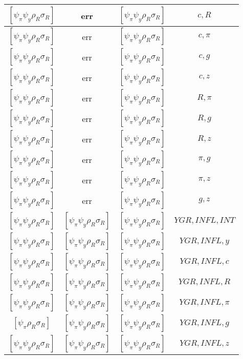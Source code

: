 \documentclass[a4paper,10pt]{article}
\begin{document}
\begin{longtable}{|c|c|c|c|}
\hline
$[\psi_\pi \psi_y \rho_R \sigma_R ]$ & err & $[\psi_\pi \psi_y \rho_R \sigma_R ]$ & ${c},{R}$ \\
\hline
$[\psi_\pi \psi_y \rho_R \sigma_R ]$ & err & $[\psi_\pi \psi_y \rho_R \sigma_R ]$ & ${c},{\pi}$ \\
\hline
$[\psi_\pi \psi_y \rho_R \sigma_R ]$ & err & $[\psi_\pi \psi_y \rho_R \sigma_R ]$ & ${c},{g}$ \\
\hline
$[\psi_\pi \psi_y \rho_R \sigma_R ]$ & err & $[\psi_\pi \psi_y \rho_R \sigma_R ]$ & ${c},{z}$ \\
\hline
$[\psi_\pi \psi_y \rho_R \sigma_R ]$ & err & $[\psi_\pi \psi_y \rho_R \sigma_R ]$ & ${R},{\pi}$ \\
\hline
$[\psi_\pi \psi_y \rho_R \sigma_R ]$ & err & $[\psi_\pi \psi_y \rho_R \sigma_R ]$ & ${R},{g}$ \\
\hline
$[\psi_\pi \psi_y \rho_R \sigma_R ]$ & err & $[\psi_\pi \psi_y \rho_R \sigma_R ]$ & ${R},{z}$ \\
\hline
$[\psi_\pi \psi_y \rho_R \sigma_R ]$ & err & $[\psi_\pi \psi_y \rho_R \sigma_R ]$ & ${\pi},{g}$ \\
\hline
$[\psi_\pi \psi_y \rho_R \sigma_R ]$ & err & $[\psi_\pi \psi_y \rho_R \sigma_R ]$ & ${\pi},{z}$ \\
\hline
$[\psi_\pi \psi_y \rho_R \sigma_R ]$ & err & $[\psi_\pi \psi_y \rho_R \sigma_R ]$ & ${g},{z}$ \\
\hline
$[\psi_\pi \psi_y \rho_R \sigma_R ]$ & $[\psi_\pi \psi_y \rho_R \sigma_R ]$ & $[\psi_\pi \psi_y \rho_R \sigma_R ]$ & ${YGR},{INFL},{INT}$ \\
\hline
$[\psi_\pi \psi_y \rho_R \sigma_R ]$ & $[\psi_\pi \psi_y \rho_R \sigma_R ]$ & $[\psi_\pi \psi_y \rho_R \sigma_R ]$ & ${YGR},{INFL},{y}$ \\
\hline
$[\psi_\pi \psi_y \rho_R \sigma_R ]$ & $[\psi_\pi \psi_y \rho_R \sigma_R ]$ & $[\psi_\pi \psi_y \rho_R \sigma_R ]$ & ${YGR},{INFL},{c}$ \\
\hline
$[\psi_\pi \psi_y \rho_R \sigma_R ]$ & $[\psi_\pi \psi_y \rho_R \sigma_R ]$ & $[\psi_\pi \psi_y \rho_R \sigma_R ]$ & ${YGR},{INFL},{R}$ \\
\hline
$[\psi_\pi \psi_y \rho_R \sigma_R ]$ & $[\psi_\pi \psi_y \rho_R \sigma_R ]$ & $[\psi_\pi \psi_y \rho_R \sigma_R ]$ & ${YGR},{INFL},{\pi}$ \\
\hline
$[\psi_\pi \rho_R \sigma_R ]$ & $[\psi_\pi \psi_y \rho_R \sigma_R ]$ & $[\psi_\pi \psi_y \rho_R \sigma_R ]$ & ${YGR},{INFL},{g}$ \\
\hline
$[\psi_\pi \psi_y \rho_R \sigma_R ]$ & $[\psi_\pi \psi_y \rho_R \sigma_R ]$ & $[\psi_\pi \psi_y \rho_R \sigma_R ]$ & ${YGR},{INFL},{z}$ \\

\end{longtable}
\end{document}
